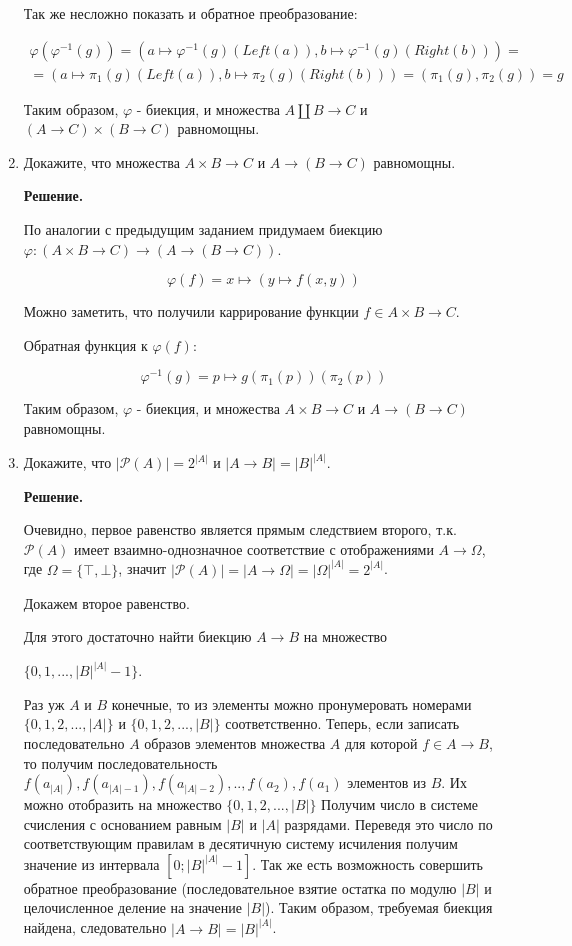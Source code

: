\begin{enumerate}
Так же несложно показать и обратное преобразование:

\begin{equation*}
\begin{array} {lcl}
	\varphi(\varphi^{-1}(g)) = (a \mapsto \varphi^{-1}(g)(Left(a)), b \mapsto \varphi^{-1}(g)(Right(b))) = \\
	= (a \mapsto \pi_1(g)(Left(a)), b \mapsto \pi_2(g)(Right(b))) = (\pi_1(g), \pi_2(g)) = g
\end{array}
\end{equation*}

Таким образом, $\varphi$ - биекция, и множества $A \amalg B \to C$ и $(A \to C) \times (B \to C)$ равномощны.

\item Докажите, что множества $A \times B \to C$ и $A \to (B \to C)$ равномощны.

\textbf{Решение.} 

По аналогии с предыдущим заданием придумаем биекцию $\varphi : (A \times B \to C)\to (A \to (B \to C))$.

$$\varphi(f) = x \mapsto (y \mapsto f(x, y))$$

Можно заметить, что получили каррирование функции $f \in A \times B \to C$.

Обратная функция к $\varphi(f)$:

$$\varphi^{-1}(g) = p \mapsto g(\pi_1(p))(\pi_2(p))$$

Таким образом, $\varphi$ - биекция, и множества $A \times B \to C$ и $A \to (B \to C)$ равномощны.

\item Докажите, что $|\mathcal{P}(A)| = 2^{|A|}$ и $|A \to B| = |B|^{|A|}$.

\textbf{Решение.} 

Очевидно, первое равенство является прямым следствием второго, т.к. $\mathcal{P}(A)$ имеет взаимно-однозначное соответствие с отображениями $A \to \Omega$, где $\Omega = \{ \top, \bot \}$, значит $|\mathcal{P}(A)| = |A \to \Omega| = |\Omega|^{|A|} = 2^{|A|}$.

Докажем второе равенство.

Для этого достаточно найти биекцию $A \to B$ на множество 

$\{0, 1, ..., |B|^{|A|} - 1 \}$.

Раз уж $A$ и $B$ конечные, то из элементы можно пронумеровать номерами $\{0, 1, 2,..., |A|\}$ и $\{0, 1, 2,..., |B|\}$ соответственно. Теперь, если записать последовательно $A$ образов элементов множества $A$ для которой $f \in A \to B$, то получим последовательность $f(a_{|A|}), f(a_{|A| - 1}), f(a_{|A| - 2}), .., f(a_2), f(a_1)$ элементов из $B$. Их можно отобразить на множество $\{0, 1, 2,..., |B|\}$ Получим число в системе счисления с основанием равным $|B|$ и $|A|$ разрядами. Переведя это число по соответствующим правилам в десятичную систему исчиления получим значение из интервала $[0; |B|^{|A|} - 1]$. Так же есть возможность совершить обратное преобразование (последовательное взятие остатка по модулю $|B|$ и целочисленное деление на значение $|B|$). Таким образом, требуемая биекция найдена, следовательно $|A \to B| = |B|^{|A|}$.

\end{enumerate}